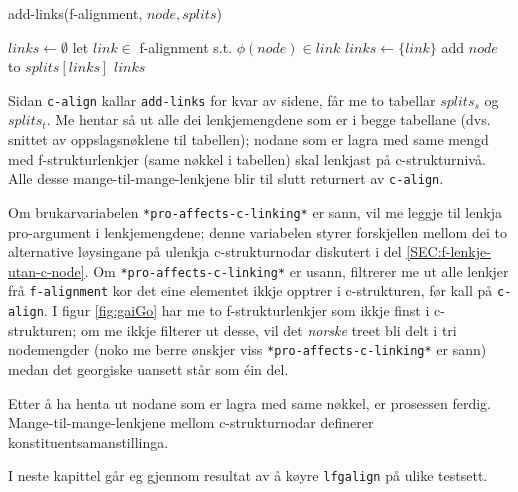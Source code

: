 \documentclass[12pt,a4paper,oneside,draft]{report}
\begin{document}
   \begin{algorithm}[htbp]
   \caption{add-links(f-alignment, $node, splits$)}
   \label{algo:add-links}
      
        $links \gets \emptyset$\;
    {
        {
          let $link \in$ f-alignment s.t. $\phi(node) \in link$ \;
           {$links \gets \{link\}$} \;
           {
          }
        }
        add $node$ to $splits[links]$ \;
       }
        \Return $links$ \;
  \end{algorithm}

Sidan \texttt{c-align} kallar \texttt{add-links} for kvar av sidene, får me to
 tabellar $splits_s$ og $splits_t$.  Me hentar så ut alle dei
 lenkjemengdene som er i begge tabellane (dvs. snittet av
 oppslagsnøklene til tabellen); nodane som er lagra med same mengd med
 f\hyp{}strukturlenkjer (same nøkkel i tabellen) skal lenkjast på
 c\hyp{}strukturnivå. Alle desse mange-til-mange-lenkjene blir til slutt
 returnert av \texttt{c-align}.

 Om brukarvariabelen \texttt{*pro-affects-c-linking*} er sann, vil me leggje
 til lenkja pro\hyp{}argument i lenkjemengdene; denne variabelen styrer
 forskjellen mellom dei to alternative løysingane på ulenkja
 c\hyp{}strukturnodar diskutert i del \ref{SEC:f-lenkje-utan-c-node}. Om
 \texttt{*pro-affects-c-linking*} er usann, filtrerer me ut alle lenkjer frå
 \texttt{f-alignment} kor det eine elementet ikkje opptrer i c\hyp{}strukturen,
 før kall på \texttt{c-align}.  I figur \ref{fig:gaiGo} har me to
 f\hyp{}strukturlenkjer som ikkje finst i c\hyp{}strukturen; om me ikkje
 filterer ut desse, vil det \emph{norske} treet bli delt i tri nodemengder
 (noko me berre ønskjer viss \texttt{*pro-affects-c-linking*} er sann) medan
 det georgiske uansett står som éin del.

Etter å ha henta ut nodane som er lagra med same nøkkel, er prosessen
 ferdig. Mange-til-mange-lenkjene mellom c\hyp{}strukturnodar definerer
 konstituentsamanstillinga.

I neste kapittel går eg gjennom resultat av å køyre \texttt{lfgalign} på
 ulike testsett.
\end{document}
